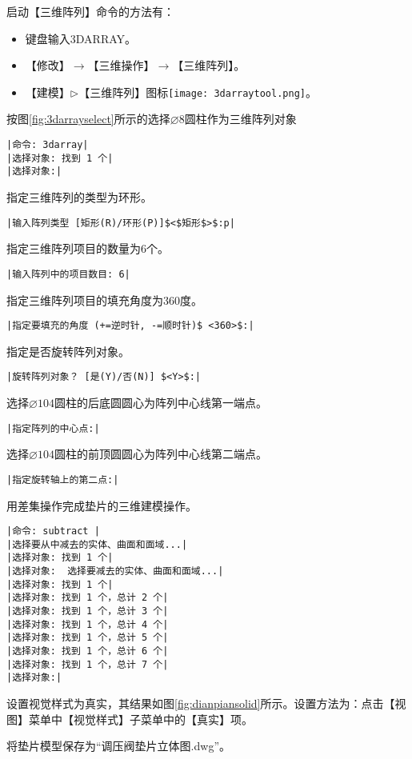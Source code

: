 \begin{procedure}
启动【三维阵列】命令的方法有：
\begin{itemize}
\item 键盘输入3DARRAY。
\item 【修改】$\rightarrow$【三维操作】$\rightarrow$【三维阵列】。
\item 【建模】$\triangleright$【三维阵列】图标\texttt{[image: 3darraytool.png]}。
\end{itemize}

按图\ref{fig:3darrayselect}所示的选择$\diameter 8$圆柱作为三维阵列对象
\begin{lstlisting}
|命令: 3darray|
|选择对象: 找到 1 个|
|选择对象:|
\end{lstlisting}
指定三维阵列的类型为环形。
\begin{lstlisting}
|输入阵列类型 [矩形(R)/环形(P)]$<$矩形$>$:p|
\end{lstlisting}
指定三维阵列项目的数量为6个。
\begin{lstlisting}
|输入阵列中的项目数目: 6|
\end{lstlisting}
指定三维阵列项目的填充角度为360度。
\begin{lstlisting}
|指定要填充的角度 (+=逆时针, -=顺时针)$ <360>$:|
\end{lstlisting}
指定是否旋转阵列对象。
\begin{lstlisting}
|旋转阵列对象？ [是(Y)/否(N)] $<Y>$:|
\end{lstlisting}
选择$\diameter 104$圆柱的后底圆圆心为阵列中心线第一端点。
\begin{lstlisting}
|指定阵列的中心点:|
\end{lstlisting}
选择$\diameter 104$圆柱的前顶圆圆心为阵列中心线第二端点。
\begin{lstlisting}
|指定旋转轴上的第二点:|
\end{lstlisting}
\item 用差集操作完成垫片的三维建模操作。
\begin{lstlisting}
|命令: subtract |
|选择要从中减去的实体、曲面和面域...|
|选择对象: 找到 1 个|
|选择对象:  选择要减去的实体、曲面和面域...|
|选择对象: 找到 1 个|
|选择对象: 找到 1 个，总计 2 个|
|选择对象: 找到 1 个，总计 3 个|
|选择对象: 找到 1 个，总计 4 个|
|选择对象: 找到 1 个，总计 5 个|
|选择对象: 找到 1 个，总计 6 个|
|选择对象: 找到 1 个，总计 7 个|
|选择对象:|
\end{lstlisting}
\item 设置视觉样式为真实，其结果如图\ref{fig:dianpiansolid}所示。设置方法为：点击【视图】菜单中【视觉样式】子菜单中的【真实】项。
\item 将垫片模型保存为“调压阀垫片立体图.dwg”。
\end{procedure}
\endinput